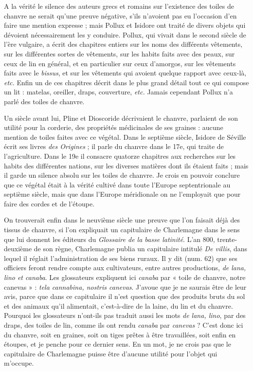 \documentclass[a4paper, 11pt, oneside, polutonikogreek, french]{article}
\begin{document}
A la vérité le silence des auteurs grecs et romains sur l'existence des toiles de chanvre ne serait qu'une preuve négative, s'ils n'avoient pas eu l'occasion d'en faire une mention expresse ; mais Pollux et Isidore ont traité de divers objets qui dévoient nécessairement les y conduire. Pollux, qui vivait dans le second siècle de l'ère vulgaire, a écrit des chapitres entiers sur les noms des différents vêtements, sur les différentes sortes de vêtements, sur les habits faits avec des peaux, sur ceux de lin en général, et en particulier sur ceux d'amorgos, sur les vêtements faits avec le \emph{bissus}, et sur les vêtements qui avoient quelque rapport avec ceux-là, \emph{etc.} Enfin un de ces chapitres décrit dans le plus grand détail tout ce qui compose un lit : matelas, oreiller, draps, couverture, \emph{etc.} Jamais cependant Pollux n'a parlé des toiles de chanvre.

Un siècle avant lui, Pline et Dioscoride décrivaient le chanvre, parlaient de son utilité pour la corderie, des propriétés médicinales de ses graines : aucune mention de toiles faites avec ce végétal. Dans le septième siècle, Isidore de Séville écrit ses livres \emph{des Origines} ; il parle du chanvre dans le 17e, qui traite de l'agriculture. Dans le 19e il consacre quatorze chapitres aux recherches sur les habits des différentes nations, sur les diverses matières dont ils étaient faits ; mais il garde un silence absolu sur les toiles de chanvre. Je crois en pouvoir conclure que ce végétal était à la vérité cultivé dans toute l'Europe septentrionale au septième siècle, mais que dans l'Europe méridionale on ne l'employait que pour faire des cordes et de l'étoupe.

On trouverait enfin dans le neuvième siècle une preuve que l'on faisait déjà des tissus de chanvre, si l'on expliquait un capitulaire de Charlemagne dans le sens que lui donnent les éditeurs du \emph{Glossaire de la basse latinité}. L'an 800, trente-deuxième de son règne, Charlemagne publia un capitulaire intitulé \emph{De villis}, dans lequel il réglait l'administration de ses biens ruraux. Il y dit (num. 62) que ses officiers feront rendre compte aux cultivateurs, entre autres productions, \emph{de lana, lino et canaba}. Les glossateurs expliquent ici \emph{canaba} par « toile de chanvre, notre canevas » : \emph{tela cannabina, nostris canevas}. J'avoue que je ne saurais être de leur avis, parce que dans ce capitulaire il n'est question que des produits bruts du sol et des animaux qu'il alimentait, c'est-à-dire de la laine, du lin et du chanvre. Pourquoi les glossateurs n'ont-ils pas traduit aussi les mots \emph{de lana, lino}, par des draps, des toiles de lin, comme ils ont rendu \emph{canaba} par \emph{canevas} ? C'est donc ici du chanvre, soit en graines, soit on tiges prêtes à être travaillées, soit enfin en étoupes, et je penche pour ce dernier sens. En un mot, je ne crois pas que le capitulaire de Charlemagne puisse être d'aucune utilité pour l'objet qui m'occupe.
\end{document}
